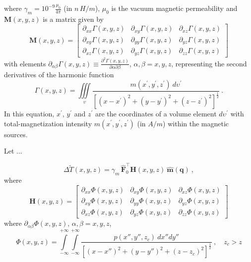 where $\gamma_{m} = 10^{-9} \frac{\mu_{0}}{4 \pi}$ (in $n \, H / m $), 
$\mu_{0}$ is the vacuum magnetic permeability and $\mathbf{M}(x, y, z)$ is a matrix 
given by
\begin{equation}
	\mathbf{M}(x, y, z) = \begin{bmatrix}
		\partial_{xx} \Gamma(x, y, z) & 
		\partial_{xy} \Gamma(x, y, z) &
		\partial_{xz} \Gamma(x, y, z) \\
		\partial_{xy} \Gamma(x, y, z) & 
		\partial_{yy} \Gamma(x, y, z) &
		\partial_{yz} \Gamma(x, y, z) \\
		\partial_{xz} \Gamma(x, y, z) & 
		\partial_{yz} \Gamma(x, y, z) &
		\partial_{zz} \Gamma(x, y, z)
	\end{bmatrix}
	\label{eq:M-matrix}
\end{equation}
with elements
$\partial_{\alpha\beta} \Gamma(x, y, z) \equiv 
\frac{\partial^{2} \Gamma(x, y, z)}{\partial \alpha \partial \beta}$, 
$\alpha, \beta = x, y, z$, representing the second derivatives of the harmonic
function
\begin{equation}
\Gamma(x, y, z) = \iiint\limits_{\upsilon} 
\frac{m(x^{\prime}, y^{\prime}, z^{\prime}) \: d\upsilon^{\prime}}
{\left[ (x-x^{\prime})^2 + (y-y^{\prime})^2 + (z-z^{\prime})^2 \right]^{\frac{1}{2}}} \: .
\label{eq:Gamma-volume-integral}
\end{equation}
In this equation, $x^{\prime}$, $y^{\prime}$ and $z^{\prime}$ are the coordinates 
of a volume element $d \upsilon^{\prime}$ with total-magnetization intensity
$m(x^{\prime}, y^{\prime}, z^{\prime})$ (in $A/m$) within the magnetic sources.

Let ...


\begin{equation}
\Delta \tilde{T}(x, y, z) = \gamma_{m} \, \hat{\mathbf{F}}_{0}^{\top} \mathbf{H}(x, y, z) \: 
\hat{\mathbf{m}}(\mathbf{q}) \: ,
\label{eq:tfanomaly-eqlayer}
\end{equation}
where
\begin{equation}
	\mathbf{H}(x, y, z) = \begin{bmatrix}
		\partial_{xx} \Phi(x, y, z) & 
		\partial_{xy} \Phi(x, y, z) &
		\partial_{xz} \Phi(x, y, z) \\
		\partial_{xy} \Phi(x, y, z) & 
		\partial_{yy} \Phi(x, y, z) &
		\partial_{yz} \Phi(x, y, z) \\
		\partial_{xz} \Phi(x, y, z) & 
		\partial_{yz} \Phi(x, y, z) &
		\partial_{zz} \Phi(x, y, z)
	\end{bmatrix}
	\label{eq:H-matrix}
\end{equation}
where 
$\partial_{\alpha\beta} \Phi(x, y, z)$, $\alpha, \beta = x, y, z$,
\begin{equation}
	\Phi(x, y, z) = \int\limits_{-\infty}^{+\infty}\int\limits_{-\infty}^{+\infty}
	\frac{p(x'', y'', z_{c}) \: dx''dy''}
	{\left[ (x-x'')^2 + (y-y'')^2 + (z-z_{c})^2 \right]^{\frac{1}{2}}} \: ,
	\quad z_{c} > z
	\label{eq:Phi-surface-integral}
\end{equation}

